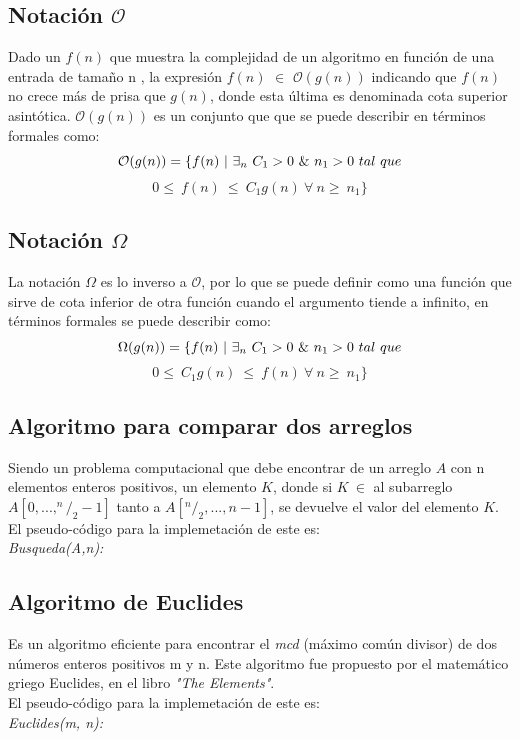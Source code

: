 \documentclass[12pt,twoside]{article}
\begin{document}
\subsection{Notaci\'on $\mathcal{O}$}
Dado un $f(n)$ que muestra la complejidad de un algoritmo en función de una entrada de tama\~no n , la expresión $f(n)$ $\in$ $\mathcal{O}(g(n))$ indicando que $f(n)$ no crece más de prisa que $g(n)$, donde esta \'ultima es denominada cota superior asintótica. $\mathcal{O}(g(n))$ es un conjunto que que se puede describir en t\'erminos formales como:
$$\mathcal{O}(g(n)) = \{ f(n)~\arrowvert~\exists_{n}~C_{1}>0~\&~n_{1}>0~tal~que$$$$0\leq~f(n)~\leq~C_{1}g(n)~\forall~n\geq~n_{1}\}$$
\subsection{Notaci\'on $\Omega$}
La notación $\Omega$ es lo inverso a $\mathcal{O}$, por lo que se puede definir como una función que sirve de cota inferior de otra función cuando el argumento tiende a infinito, en t\'erminos formales se puede describir como:
$$\Omega(g(n)) = \{ f(n)~\arrowvert~\exists_{n}~C_{1}>0~\&~n_{1}>0~tal~que$$$$0\leq~C_{1}g(n)~\leq~f(n)~\forall~n\geq~n_{1}\}$$
\subsection{Algoritmo para comparar dos arreglos}
Siendo un problema computacional que debe encontrar de un arreglo $A$ con n elementos enteros positivos,  un elemento $K$, donde si $K~\in$ al subarreglo $A[0, ... , ^n/_2-1]$ tanto a $A[^n/_2, ... , n-1]$, se devuelve el valor del elemento $K$.\\
El pseudo-c\'odigo para la implemetaci\'on de este es:\\[.75cm]
    \textit{\large Busqueda(A,n):}
    \begin{algorithmic}
            \State {}
                    \State {}
                        \EndIf
                \EndFor
        \EndFor
    \end{algorithmic}
\subsection{Algoritmo de Euclides}
Es un algoritmo eficiente para encontrar el \textit{mcd} (m\'aximo com\'un divisor) de dos n\'umeros enteros positivos m y n. Este algoritmo fue propuesto por el matem\'atico griego Euclides, en el libro \textit{"The Elements"}.\\
El pseudo-c\'odigo para la implemetaci\'on de este es:\\[.75cm]
    \textit{\large Euclides(m, n):}
    \begin{algorithmic}
        \EndWhile
    \end{algorithmic}
\end{document}
